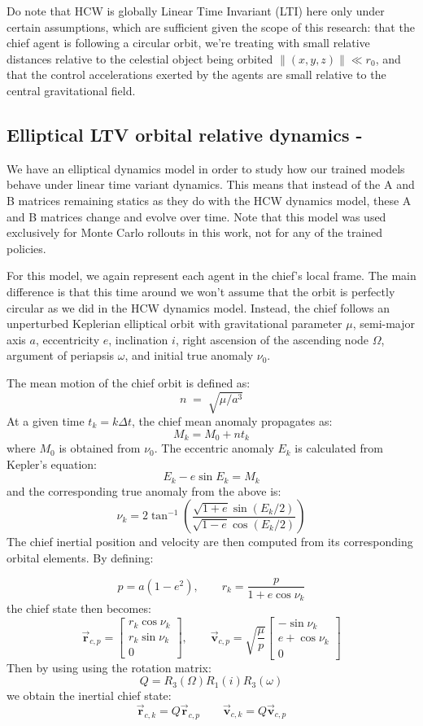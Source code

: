 Do note that HCW is globally Linear Time Invariant (LTI) here only under certain assumptions, which are sufficient given the scope of this research: that the chief agent is following a circular orbit, we're treating with small relative distances relative to the celestial object being orbited $\| (x,y,z)\| \ll r_0$, and that the control accelerations exerted by the agents are small relative to the central gravitational field.

\subsection{Elliptical LTV orbital relative dynamics - \cite{tschauner1965rendezvous}}

We have an elliptical dynamics model in order to study how our trained models behave under linear time variant dynamics. This means that instead of the A and B matrices remaining statics as they do with the HCW dynamics model, these A and B matrices change and evolve over time. Note that this model was used exclusively for Monte Carlo rollouts in this work, not for any of the trained policies.  

For this model, we again represent each agent in the chief's local frame. The main difference is that this time around we won't assume that the orbit is perfectly circular as we did in the HCW dynamics model. Instead, the chief follows an unperturbed Keplerian elliptical orbit with gravitational parameter $\mu$, semi-major axis $a$, eccentricity $e$, inclination $i$, right ascension of the ascending node $\Omega$, argument of periapsis $\omega$, and initial true anomaly $\nu_0$. 


The mean motion of the chief orbit is defined as:
\[
n \;=\; \sqrt{\mu/a^3}
\]
At a given time $t_k = k\Delta t$, the chief mean anomaly propagates as:
\[
M_k = M_0 + nt_k
\]
where $M_0$ is obtained from $\nu_0$. The eccentric anomaly $E_k$ is calculated from Kepler's equation:
\[
E_k - e\sin E_k = M_k
\]
and the corresponding true anomaly from the above is:
\[
\nu_k
=
2 \tan^{-1}
\left(
\frac{\sqrt{1+e}\sin(E_k/2)}
     {\sqrt{1-e}\cos(E_k/2)}
\right)
\]
The chief inertial position and velocity are then computed from its corresponding orbital elements. By defining:


\[
p = a(1-e^2),
\qquad
r_k = \frac{p}{1+e\cos\nu_k}
\]
the chief state then becomes:
\[
\vec{\mathbf{r}}_{c,p}
=
\begin{bmatrix}
r_k\cos\nu_k\\
r_k\sin\nu_k\\
0
\end{bmatrix},
\qquad
\vec{\mathbf{v}}_{c,p}
=
\sqrt{\frac{\mu}{p}}
\begin{bmatrix}
-\sin\nu_k\\
e+\cos\nu_k\\
0
\end{bmatrix}
\]
Then by using using the rotation matrix:
\[
Q = R_3(\Omega)R_1(i)R_3(\omega)
\]
we obtain the inertial chief state:
\[
\vec{\mathbf{r}}_{c,k} = Q\vec{\mathbf{r}}_{c,p}
\qquad
\vec{\mathbf{v}}_{c,k} = Q\vec{\mathbf{v}}_{c,p}
\]


